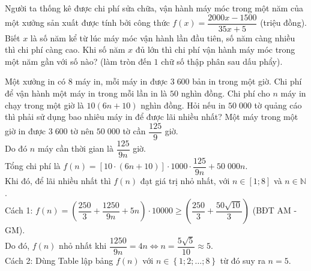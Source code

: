 \begin{bt}%

Người ta thống kê được chi phí sửa chữa, vận hành máy móc trong một năm của một xưởng sản xuất được tính bởi công thức $f(x)=\dfrac{2000x-1500}{35x+5}$ (triệu đồng). Biết $x$ là số năm kể từ lúc máy móc vận hành lần đầu tiên, số năm càng nhiều thì chi phí càng cao. Khi số năm $x$ đủ lớn thì chi phí vận hành máy móc trong một năm gần với số nào? (làm tròn đến $1$ chữ số thập phân sau dấu phẩy).
\end{bt}

\begin{bt}%

	Một xưởng in có $8$ máy in, mỗi máy in được $3\;600$ bản in trong một giờ. Chi phí để vận hành một máy in trong mỗi lần in là $50$ nghìn đồng. Chi phí cho $n$ máy in chạy trong một giờ là $10(6n+10)$ nghìn đồng. Hỏi nếu in $50\;000$ tờ quảng cáo thì phải sử dụng bao nhiêu máy in để được lãi nhiều nhất?	
	\loigiai
	{Một máy trong một giờ in được $3\;600$ tờ nên $50\;000$ tờ cần $\dfrac{125}{9}$ giờ.\\
		Do đó $n$ máy cần thời gian là $\dfrac{125}{9n}$ giờ.\\
		Tổng chi phí là $f(n)=\left[10\cdot \left(6n+10\right)\right]\cdot 1000\cdot\dfrac{125}{9n}+50\;000n$.\\
		Khi đó, để lãi nhiều nhất thì $f(n)$ đạt giá trị nhỏ nhất, với $n\in \left[1;8\right]$ và $n\in \mathbb{N}$.\\
		Cách 1: $f(n)=\left(\dfrac{250}{3}+\dfrac{1250}{9n}+5n\right)\cdot 10000\geq \left(\dfrac{250}{3}+\dfrac{50\sqrt{10}}{3}\right)$ (BĐT AM - GM).\\
		Do đó, $f(n)$ nhỏ nhất khi $\dfrac{1250}{9n}=4n\Leftrightarrow n =\dfrac{5\sqrt{5}}{10}\approx 5$.\\
		Cách 2: Dùng Table lập bảng $f(n)$ với $n\in \left\{1; 2; \ldots ; 8\right\}$ từ đó suy ra $n=5$.  
	}
\end{bt}


